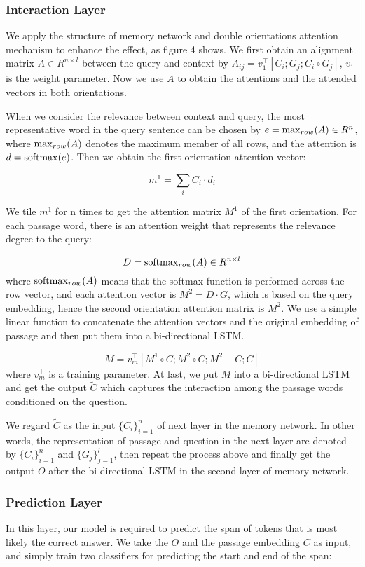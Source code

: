 \documentclass[sigconf]{acmart}
\begin{document}
\subsubsection{\textbf{Interaction Layer}}
We apply the structure of memory network and double orientations attention mechanism to enhance the effect, as figure 4 shows. We first obtain an alignment matrix $A \in R^{n \times l}$ between the query and context by $A_{ij} = v_{1}^{\top}[C_{i};G_{j};C_{i} \circ G_{j}]$, $v_1$ is the weight parameter. Now we use $A$ to obtain the attentions and the attended vectors in both orientations.

When we consider the relevance between context and query, the most representative word in the query sentence can be chosen by $e = {\rm max}_{row}(A) \in R^{n} $, where ${\rm max}_{row}(A)$ denotes the maximum member of all rows, and the attention is $d = {\rm softmax}(e)$. Then we obtain the first orientation attention vector:

$$m^{1} = \sum_{i} C_{i}  \cdot d_i$$

We tile $m^1$ for n times to get the attention matrix $M^1$ of the first orientation. For each passage word, there is an attention weight that represents the relevance degree to the query:

$$D = {\rm softmax}_{row} (A) \in R^{n \times l}$$
where ${\rm softmax}_{row}(A)$ means that the softmax function is performed across the row vector, and each attention vector is $M^{2}= D \cdot G $, which is based on the query embedding, hence the second orientation attention matrix is $M^2$. We use a simple linear function to concatenate the attention vectors and the original embedding of passage and then put them into a bi-directional LSTM. 

$$M = v^{\top}_{m}[M^1 \circ C; M^2 \circ C; M^2 - C; C]$$
where $v^{\top}_{m}$ is a training parameter. At last, we put $M$ into a bi-directional LSTM and get the output $\tilde{C}$ which captures the interaction among the passage words conditioned on the question. 

We regard $\tilde{C}$ as the input $\{ C_{i} \}^{n}_{i=1}$ of next layer in the memory network. In other words, the representation of passage and question in the next layer are denoted by $\{ \tilde{C}_{i} \}^{n}_{i=1}$ and $\{ G_{j} \}^{l}_{j=1}$, then repeat the process above and finally get the output $O$ after the bi-directional LSTM in the second layer of memory network.

\subsubsection{\textbf{Prediction Layer}}
In this layer, our model is required to predict the span of tokens that is most likely the correct answer. We take the $O$ and the passage embedding $C$ as input, and simply train two classifiers for predicting the start and end of the span:
\end{document}

